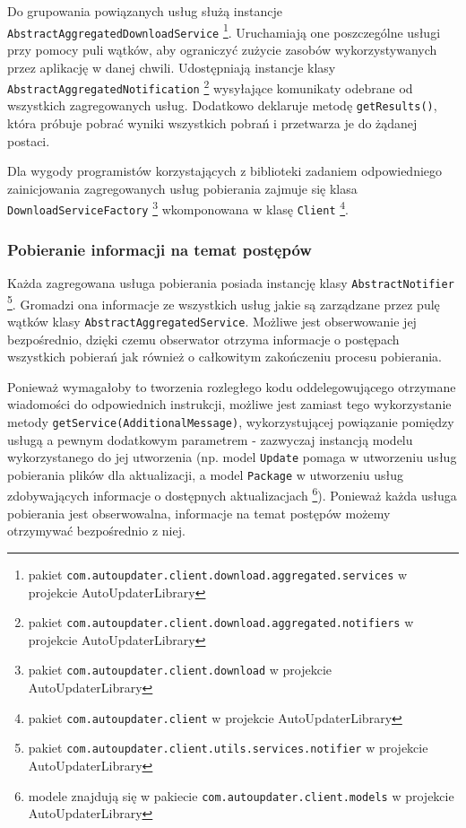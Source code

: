 \documentclass[polish,12pt,titlepage]{article}
\begin{document}
Do grupowania powiązanych usług służą instancje
\texttt{AbstractAggregatedDownloadService} \footnote{pakiet
\texttt{com.autoupdater.client.download.aggregated.services} w projekcie
AutoUpdaterLibrary}. Uruchamiają one poszczególne usługi przy pomocy puli
wątków, aby ograniczyć zużycie zasobów wykorzystywanych przez aplikację w
danej chwili. Udostępniają instancje klasy
\texttt{AbstractAggregatedNotification} \footnote{pakiet
\texttt{com.autoupdater.client.download.aggregated.notifiers} w projekcie
AutoUpdaterLibrary} wysyłające komunikaty odebrane od wszystkich zagregowanych
usług. Dodatkowo deklaruje metodę \texttt{getResults()}, która próbuje pobrać
wyniki wszystkich pobrań i przetwarza je do żądanej postaci.

Dla wygody programistów korzystających z biblioteki zadaniem odpowiedniego
zainicjowania zagregowanych usług pobierania zajmuje się klasa
\texttt{DownloadServiceFactory} \footnote{pakiet
\texttt{com.autoupdater.client.download} w projekcie AutoUpdaterLibrary}
wkomponowana w klasę \texttt{Client} \footnote{pakiet
\texttt{com.autoupdater.client} w projekcie AutoUpdaterLibrary}.

\subsubsection{Pobieranie informacji na temat postępów}

Każda zagregowana usługa pobierania posiada instancję klasy
\texttt{AbstractNotifier} \footnote{pakiet
\texttt{com.autoupdater.client.utils.services.notifier} w projekcie
AutoUpdaterLibrary}. Gromadzi ona informacje ze wszystkich usług jakie
są zarządzane przez pulę wątków klasy \texttt{AbstractAggregatedService}.
Możliwe jest obserwowanie jej bezpośrednio, dzięki czemu obserwator otrzyma
informacje o postępach wszystkich pobierań jak również o całkowitym
zakończeniu procesu pobierania.

Ponieważ wymagałoby to tworzenia rozległego kodu oddelegowującego otrzymane
wiadomości do odpowiednich instrukcji, możliwe jest zamiast tego wykorzystanie
metody \texttt{getService(AdditionalMessage)}, wykorzystującej powiązanie
pomiędzy usługą a pewnym dodatkowym parametrem - zazwyczaj instancją modelu
wykorzystanego do jej utworzenia (np. model \texttt{Update} pomaga w
utworzeniu usług pobierania plików dla aktualizacji, a model \texttt{Package}
w utworzeniu usług zdobywających informacje o dostępnych aktualizacjach
\footnote{modele znajdują się w pakiecie
\texttt{com.autoupdater.client.models} w projekcie AutoUpdaterLibrary}).
Ponieważ każda usługa pobierania jest obserwowalna, informacje na temat
postępów możemy otrzymywać bezpośrednio z niej.
\end{document}
